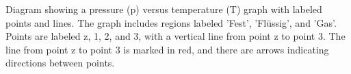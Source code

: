 Diagram showing a pressure (p) versus temperature (T) graph with labeled points and lines. The graph includes regions labeled 'Fest', 'Flüssig', and 'Gas'. Points are labeled z, 1, 2, and 3, with a vertical line from point z to point 3. The line from point z to point 3 is marked in red, and there are arrows indicating directions between points.